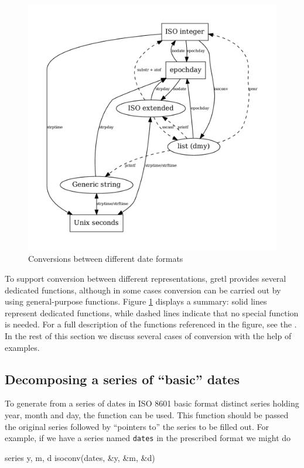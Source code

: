 \begin{figure}[htbp]
  \centering
  \includegraphics[scale=0.667]{figures/date-conversion}
  \caption{Conversions between different date formats}
  \label{fig:cal-conversions}
\end{figure}

To support conversion between different representations, gretl
provides several dedicated functions, although in some cases
conversion can be carried out by using general-purpose
functions. Figure \ref{fig:cal-conversions} displays a summary: solid
lines represent dedicated functions, while dashed lines indicate that
no special function is needed. For a full description of the functions
referenced in the figure, see the \GCR. In the rest of this section we
discuss several cases of conversion with the help of examples.

\subsection{Decomposing a series of ``basic'' dates}

To generate from a series of dates in ISO 8601 basic format distinct
series holding year, month and day, the function  can be
used. This function should be passed the original series followed by
``pointers to'' the series to be filled out. For example, if we have a
series named \texttt{dates} in the prescribed format we might do
%
\begin{code}
series y, m, d
isoconv(dates, &y, &m, &d)
\end{code}

